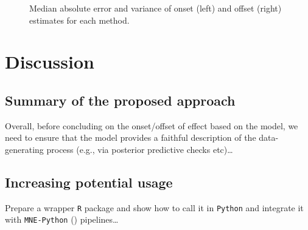 \documentclass[
  doc,
  floatsintext,
  longtable,
  a4paper,
  nolmodern,
  notxfonts,
  notimes,
  colorlinks=true,linkcolor=blue,citecolor=blue,urlcolor=blue]{apa7}
\begin{document}
\begin{figure}[!htb]

\caption{\label{fig-reliability}Median absolute error and variance of
onset (left) and offset (right) estimates for each method.}


\end{figure}%

\newpage

\section{Discussion}\label{discussion}

\subsection{Summary of the proposed
approach}\label{summary-of-the-proposed-approach}

Overall, before concluding on the onset/offset of effect based on the
model, we need to ensure that the model provides a faithful description
of the data-generating process (e.g., via posterior predictive checks
etc)\ldots{}

\subsection{Increasing potential
usage}\label{increasing-potential-usage}

Prepare a wrapper \texttt{R} package and show how to call it in
\texttt{Python} and integrate it with \texttt{MNE-Python}
() pipelines\ldots{}
\end{document}
